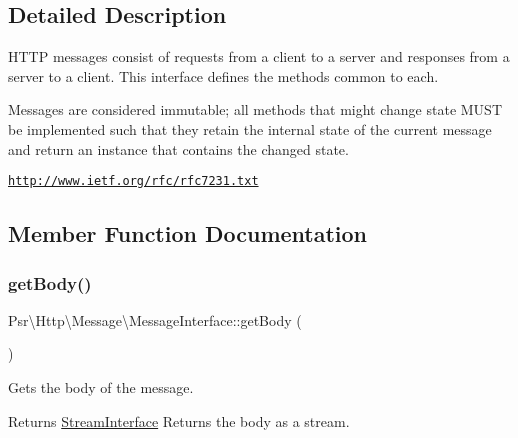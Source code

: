 \subsection{Detailed Description}
H\+T\+TP messages consist of requests from a client to a server and responses from a server to a client. This interface defines the methods common to each.

Messages are considered immutable; all methods that might change state M\+U\+ST be implemented such that they retain the internal state of the current message and return an instance that contains the changed state.

\hyperlink{}{\href{http://www.ietf.org/rfc/rfc7231.txt}{\tt http\+://www.\+ietf.\+org/rfc/rfc7231.\+txt} }

\subsection{Member Function Documentation}
\mbox{\label{interfacePsr_1_1Http_1_1Message_1_1MessageInterface_a7d016c18bd79d98029cf538a59827421}} 
\subsubsection{\texorpdfstring{get\+Body()}{getBody()}}
{\footnotesize\ttfamily Psr\textbackslash{}\+Http\textbackslash{}\+Message\textbackslash{}\+Message\+Interface\+::get\+Body (\begin{DoxyParamCaption}{ }\end{DoxyParamCaption})}

Gets the body of the message.

\begin{DoxyReturn}{Returns}
\hyperlink{interfacePsr_1_1Http_1_1Message_1_1StreamInterface}{Stream\+Interface} Returns the body as a stream. 
\end{DoxyReturn}
\mbox{\label{interfacePsr_1_1Http_1_1Message_1_1MessageInterface_a34a66651408f54c5d26d68b7796ecad6}} 
